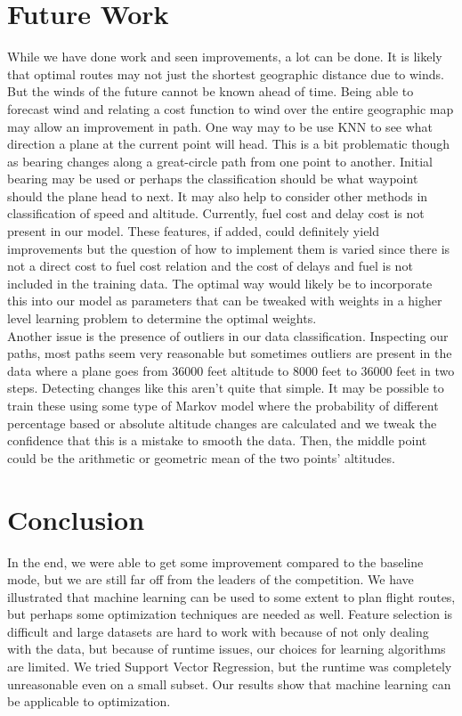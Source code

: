 \documentclass{article}[12pt]
\begin{document}
\begin{multicols}{2}
\section{Future Work}
While we have done work and seen improvements, a lot can be done. It is likely that optimal routes may not just the shortest geographic distance due to winds. But the winds of the future cannot be known ahead of time. Being able to forecast wind and relating a cost function to wind over the entire geographic map may allow an improvement in path. One way may to be use KNN to see what direction a plane at the current point will head. This is a bit problematic though as bearing changes along a great-circle path from one point to another. Initial bearing may be used or perhaps the classification should be what waypoint should the plane head to next. It may also help to consider other methods in classification of speed and altitude. Currently, fuel cost and delay cost is not present in our model. These features, if added, could definitely yield improvements but the question of how to implement them is varied since there is not a direct cost to fuel cost relation and the cost of delays and fuel is not included in the training data. The optimal way would likely be to incorporate this into our model as parameters that can be tweaked with weights in a higher level learning problem to determine the optimal weights. \\

Another issue is the presence of outliers in our data classification. Inspecting our paths, most paths seem very reasonable but sometimes outliers are present in the data where a plane goes from 36000 feet altitude to 8000 feet to 36000 feet in two steps. Detecting changes like this aren't quite that simple. It may be possible to train these using some type of Markov model where the probability of different percentage based or absolute altitude changes are calculated and we tweak the confidence that this is a mistake to smooth the data. Then, the middle point could be the arithmetic or geometric mean of the two points' altitudes.

\section{Conclusion}
In the end, we were able to get some improvement compared to the baseline mode, but we are still far off from the leaders of the competition. We have illustrated that machine learning can be used to some extent to plan flight routes, but perhaps some optimization techniques are needed as well. Feature selection is difficult and large datasets are hard to work with because of not only dealing with the data, but because of runtime issues, our choices for learning algorithms are limited. We tried Support Vector Regression, but the runtime was completely unreasonable even on a small subset. Our results show that machine learning can be applicable to optimization.



\end{multicols}
\end{document}
